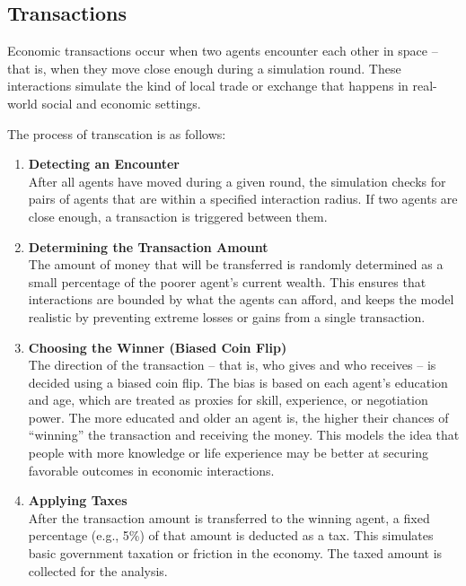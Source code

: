 \documentclass[english]{projectreport}
\begin{document}
\subsection{Transactions}
\label{sec:transactions}

Economic transactions occur when two agents encounter each other in space – that is, when they move close enough during a simulation round. These interactions simulate the kind of local trade or exchange that happens in real-world social and economic settings.

The process of transcation is as follows:

\begin{enumerate}
    \item \textbf{Detecting an Encounter} \\
        After all agents have moved during a given round, the simulation checks for pairs of agents that are within a specified interaction radius. If two agents are close enough, a transaction is triggered between them.
    \item \textbf{Determining the Transaction Amount} \\
        The amount of money that will be transferred is randomly determined as a small percentage of the poorer agent’s current wealth. This ensures that interactions are bounded by what the agents can afford, and keeps the model realistic by preventing extreme losses or gains from a single transaction.
    \item \textbf{Choosing the Winner (Biased Coin Flip)} \\
        The direction of the transaction – that is, who gives and who receives – is decided using a biased coin flip. The bias is based on each agent’s education and age, which are treated as proxies for skill, experience, or negotiation power. The more educated and older an agent is, the higher their chances of “winning” the transaction and receiving the money. This models the idea that people with more knowledge or life experience may be better at securing favorable outcomes in economic interactions.
    \item \textbf{Applying Taxes} \\
        After the transaction amount is transferred to the winning agent, a fixed percentage (e.g., 5\%) of that amount is deducted as a tax. This simulates basic government taxation or friction in the economy. The taxed amount is collected for the analysis.
\end{enumerate}
\end{document}
